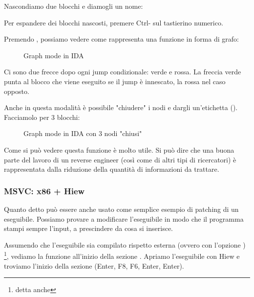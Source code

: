 Nascondiamo due blocchi e diamogli un nome:



Per espandere dei blocchi nascosti, premere Ctrl-\q{+} sul tastierino numerico.

\clearpage
Premendo , possiamo vedere come \IDA rappresenta una funzione in forma di grafo:

\begin{figure}[H]
\centering
{}
\caption{Graph mode in IDA}
\label{fig:ex3_IDA_1}
\end{figure}

Ci sono due frecce dopo ogni jump condizionale: verde e rossa.
La freccia verde punta al blocco che viene eseguito se il jump è innescato, la rossa nel caso opposto.

\clearpage
Anche in questa modalità è possibile "chiudere" i nodi e dargli un'etichetta ().
Facciamolo per 3 blocchi:

\begin{figure}[H]
\centering
{}
\caption{Graph mode in IDA con 3 nodi "chiusi"}
\label{fig:ex3_IDA_2}
\end{figure}

Come si può vedere questa funzione è molto utile.
Si può dire che una buona parte del lavoro di un reverse engineer (così come di altri tipi di ricercatori) è rappresentata dalla riduzione della quantità di informazioni da trattare.



\clearpage
\subsubsection{MSVC: x86 + Hiew}

Quanto detto può essere anche usato come semplice esempio di patching di un eseguibile.
Possiamo provare a modificare l'eseguibile in modo che il programma stampi sempre l'input, a prescindere da cosa si inserisce.

Assumendo che l'eseguibile sia compilato rispetto  esterna (ovvero con l'opzione )
\footnote{detta anche }, 
vediamo la funzione \main all'inizio della sezione .
Apriamo l'eseguibile con Hiew e troviamo l'inizio della sezione  (Enter, F8, F6, Enter, Enter).

